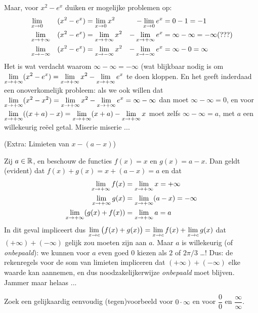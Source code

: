 \documentclass[numbers]{ximera}
\begin{document}
\begin{example}
	Maar, voor $x^2 - e^x$ duiken er mogelijke problemen op:
	\begin{alignat*}{6}
		& \limx &(x^2-e^x)   & = \limx x^2   &- \limx e^x   & = 0 - 1 = -1 \\
		& \limxi &(x^2-e^x)  & = \limxi x^2  &- \limxi e^x  & = \infty - \infty = -\infty (???) \\
		& \limxmi &(x^2-e^x) & = \limxmi x^2 &- \limxmi e^x & = \infty - 0 = \infty \\
	\end{alignat*}
	Het is wat verdacht waarom $\infty - \infty = -\infty$ (wat blijkbaar nodig is om $\limxi (x^2-e^x) = \limxi x^2  - \limxi e^x$ te doen kloppen.  En het geeft inderdaad een onoverkomelijk probleem: als we ook willen dat $\limxi (x^2  - x^2) = \limxi x^2  - \limxi e^x  = \infty - \infty$  dan moet $\infty - \infty = 0$, en voor $\limxi ((x+a) - x) = \limxi (x+a) - \limxi x$ moet zelfs $\infty - \infty = a$, met $a$ een willekeurig reëel getal. Miserie miserie ...  

\end{example}
\begin{example}(Extra: Limieten van $x - (a-x)$)
	
	Zij $a\in\mathbb{R}$, en beschouw de functies $f(x)=x$ en $g(x)=a-x$. Dan geldt (evident) dat $f(x)+g(x)=x+(a-x)=a$ en dat 
	\begin{align*}
	\limxi f(x) & = \limxi x = +\infty \\
	\limxi g(x) & = \limxi (a-x) = -\infty \\
	\limxi (g(x)+f(x)) & = \limxi a = a \\
	\end{align*}
	In dit geval impliceert dus $\limxc \big(f(x) +g(x)\big) = \limxc f(x) + \limxc g(x)$ dat $(+\infty) + (-\infty)$ gelijk zou moeten zijn aan $a$. Maar $a$ is willekeurig (of \textit{onbepaald}): we kunnen voor $a$ even goed $0$ kiezen als $2$ of $2\pi/3$ \dots! Dus: de rekenregels voor de som van limieten impliceren dat $(+\infty)+(-\infty)$ elke waarde kan aannemen, en dus noodzakelijkerwijze \textit{onbepaald} moet blijven. Jammer maar helaas ...
	
	
\end{example}
\begin{problem}
	
	Zoek een gelijkaardig eenvoudig (tegen)voorbeeld voor $0\cdot\infty$ en voor $\dfrac00$ en $\dfrac\infty\infty$.
\end{problem}
\end{document}
